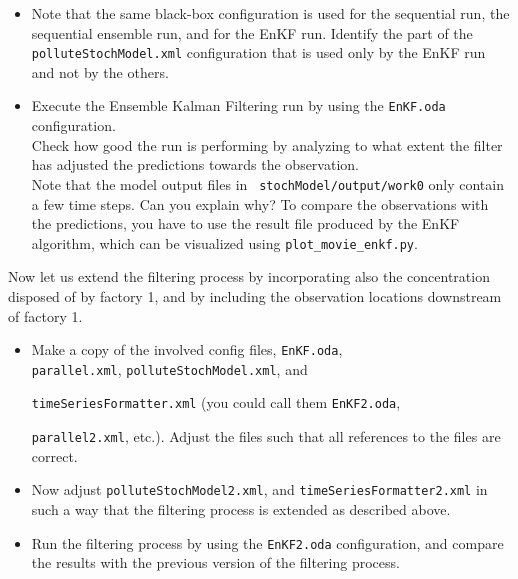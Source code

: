 \begin{itemize}
 \item Note that the same black-box configuration is used for the sequential
   run, the sequential ensemble run, and for the EnKF run. Identify the part of
   the {\tt polluteStochModel.xml} configuration that is used only by the EnKF
   run and not by the others.
 \item Execute the Ensemble Kalman Filtering run by using the {\tt EnKF.oda}
   configuration.\\ Check how good the run is performing by analyzing to what
   extent the filter has adjusted the predictions towards the
   observation.\\ Note that the model output files in {\tt
     stochModel/output/work0} only contain a few time steps. Can you explain
   why? To compare the observations with the predictions, you have to use
   the result file produced by the EnKF algorithm, which can be visualized using
   {\tt plot\_movie\_enkf.py}.
\end{itemize}

Now let us extend the filtering process by incorporating also the concentration
disposed of by factory 1, and by including the observation locations downstream of
factory 1.

\begin{itemize}
	\item Make a copy of the involved config files, {\tt EnKF.oda},\\ 
		{\tt parallel.xml}, {\tt polluteStochModel.xml}, and


		{\tt timeSeriesFormatter.xml} (you could call them
                {\tt EnKF2.oda}, 

                {\tt parallel2.xml}, etc.). Adjust the files such that all references to the files are correct.
	\item Now adjust {\tt polluteStochModel2.xml}, and {\tt timeSeriesFormatter2.xml}
	      in such a way that the filtering process is extended as described above.
 \item Run the filtering process by using the {\tt EnKF2.oda} configuration,
   and compare the results with the previous version of the filtering process.
\end{itemize}

